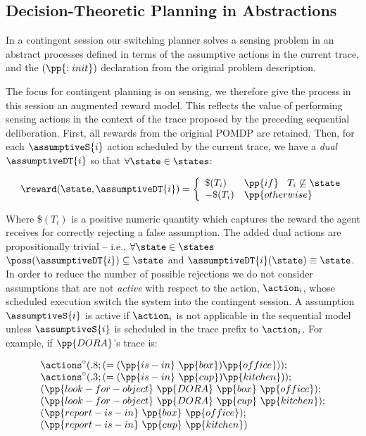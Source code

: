 \subsection{Decision-Theoretic Planning in Abstractions}

In a contingent session our switching planner solves a sensing problem
in an abstract processes defined in terms of the assumptive actions in
the current trace, and the $(\pp{:init})$ declaration from the
original problem description.

The focus for contingent planning is on sensing, we therefore give the
process in this session an augmented reward model.  This reflects the
value of performing sensing actions in the context of the trace
proposed by the preceding sequential deliberation. First, all rewards
from the original POMDP are retained. Then, for each $\assumptiveS{i}$
action scheduled by the current trace, we have a {\em dual}
$\assumptiveDT{i}$ so that $\forall\state\in\states$:

\[
\reward(\state, \assumptiveDT{i}) = \bigg\{ \begin{array}{ll}
\$(T_i) & \pp{if}~\;\;T_i \not\subseteq \state \\
-\$(T_i) & \pp{otherwise} \\
\end{array}
\]

\noindent Where $\$(T_i)$ is a positive numeric quantity which
captures the reward the agent receives for correctly rejecting a
false assumption. The added dual actions are propositionally trivial
-- i.e., $\forall\state\in\states$ $\poss(\assumptiveDT{i})
\subseteq \state$ and $\assumptiveDT{i}(\state) \equiv \state$.  
In order to reduce the number of possible rejections we do not
consider assumptions that are not {\em active} with respect to the
action, $\action_i$, whose scheduled execution switch the system into
the contingent session. A assumption $\assumptiveS{i}$ is active if
$\action_i$ is not applicable in the sequential model unless
$\assumptiveS{i}$ is scheduled in the trace prefix to $\action_i$. For
example, if $\pp{DORA}$'s trace is:

\[
\begin{array}{l}
\actions^{\circ}(.8;(=(\pp{is-in}~\pp{box})\pp{office}));\\
\actions^{\circ}(.3;(=(\pp{is-in}~\pp{cup})\pp{kitchen}));\\
(\pp{look-for-object}~\pp{DORA}~\pp{box}~\pp{office});\\
(\pp{look-for-object}~\pp{DORA}~\pp{cup}~\pp{kitchen});\\
(\pp{report-is-in}~\pp{box}~\pp{office}); \\
(\pp{report-is-in}~\pp{cup}~\pp{kitchen})
\end{array}
\]

